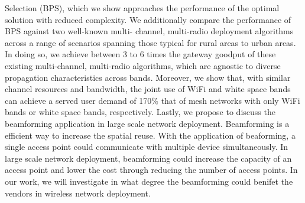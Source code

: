 Selection (BPS), which we show approaches the performance of
the optimal solution with reduced complexity. We additionally
compare the performance of BPS against two well-known multi-
channel, multi-radio deployment algorithms across a range of
scenarios spanning those typical for rural areas to urban areas.
In doing so, we achieve between 3 to 6 times the gateway goodput
of these existing multi-channel, multi-radio algorithms, which
are agnostic to diverse propagation characteristics across bands.
Moreover, we show that, with similar channel resources and
bandwidth, the joint use of WiFi and white space bands can
achieve a served user demand of 170\% that of mesh networks
with only WiFi bands or white space bands, respectively.
Lastly, we propose to discuss the beamforming application in 
large scale network deployment. Beamforming is a efficient way to 
increase the spatial reuse. With the application of beaforming,
a single access point could communicate with multiple device 
simultaneously. In large scale network deployment, beamforming
could increase the capacity of an access point and lower the cost 
through reducing the number of access points. In our work, we
will investigate in what degree the beamforming could benifet
the vendors in wireless network deployment.


